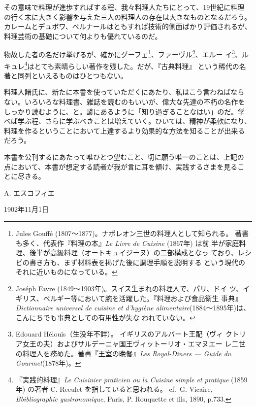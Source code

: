 \documentclass[twoside,12Q,b5paper,tombo]{ltjsbook}
\begin{document}
その意味で料理が進歩すればする程、我々料理人たちにとって、19世紀に料理
の行く末に大きく影響を与えた三人の料理人の存在は大きなものとなるだろう。
カレームとデュボワ、ベルナールはともすれば技術的側面ばかり評価されるが、
料理芸術の基礎について何よりも優れているのだ。

物故した者の名だけ挙げるが、確かにグーフェ\footnote{Jules Gouffé
  (1807〜1877)。ナポレオン三世の料理人として知られる。
  著書も多く、代表作『料理の本』\emph{Le Livre de Cuisine} (1867年) は前
  半が家庭料理、後半が高級料理（オートキュイジーヌ）の二部構成となっ
  ており、レシピの書き方も、まず材料表を掲げた後に調理手順を説明する
  という現代のそれに近いものになっている。}、ファーヴル\footnote{Joséph
  Favre (1849〜1903年)。スイス生まれの料理人で、パリ、ドイ
  ツ、イギリス、ベルギー等において腕を活躍した。『料理および食品衛生
  事典』\emph{Dictionnaire universel de cuisine et d'hygiène
  alimentaire}(1884〜1895年)は、こんにちでも事典としての有用性が失な
  われていない。}、エルー イ\footnote{Edouard Hélouis（生没年不詳）。
  イギリスのアルバート王配（ヴィ
  クトリア女王の夫）およびサルデーニャ国王ヴィットーリオ・エマヌエー
  レ二世の料理人を務めた。著書『王室の晩餐』\emph{Les Royal-Diners ---
  Guide du Gourmet}(1878年)。}、ルキュレ\footnote{『実践的料理』\emph{Le
  Cuisinier praticien ou la Cuisine simple et pratique} (1859年) の著者
  C. Reculet を指していると思われる。 cf.~G. Vicaire,
  \emph{Bbibliographie gastronomique}, Paris, P. Rouquette et fils,
  1890, p.733.}はとても素晴らしい著作を残した。だが、『古典料理』
という稀代の名著と同列といえるものはひとつもない。

料理人諸氏に、新たに本書を使っていただくにあたり、私はこう言わねばなら
ない。いろいろな料理書、雑誌を読むのもいいが、偉大な先達の不朽の名作を
しっかり読むように、と。諺にあるように「知り過ぎることなはい」のだ。学
べば学ぶ程、さらに学ぶべきことは増えていく。ひいては、精神が柔軟になり、
料理を作るということにおいて上達するより効果的な方法を知ることが出来る
だろう。

本書を公刊するにあたって唯ひとつ望むこと、切に願う唯一のことは、上記の
点において、本書が想定する読者が我が言に耳を傾け、実践するさまを見るこ
とに尽きる。

A. エスコフィエ

1902年11月1日
\end{document}

